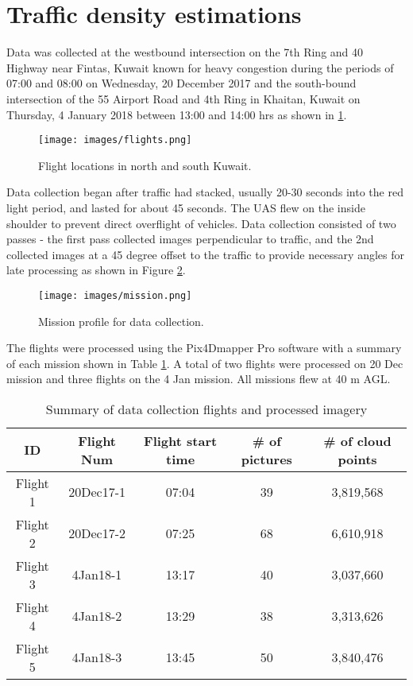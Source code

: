 \section{Traffic density estimations}

Data was collected at the westbound intersection on the 7th Ring and 40 Highway near Fintas, Kuwait known for heavy congestion during the periods of 07:00 and 08:00 on Wednesday, 20 December 2017 and the south-bound intersection of the 55 Airport Road and 4th Ring in Khaitan, Kuwait on Thursday, 4 January 2018 between 13:00 and 14:00 hrs as shown in \ref{fig:flights}. 


\begin{figure}[H]
\centering
\texttt{[image: images/flights.png]} 
\caption[Flight locations]{Flight locations in north and south Kuwait.}
\label{fig:flights}
\end{figure}

Data collection began after traffic had stacked, usually 20-30 seconds into the red light period, and lasted for about 45 seconds. The UAS flew on the inside shoulder to prevent direct overflight of vehicles. Data collection consisted of two passes - the first pass collected images perpendicular to traffic, and the 2nd collected images at a 45 degree offset to the traffic to provide necessary angles for late processing as shown in Figure \ref{fig:mission}.

\begin{figure}[H]
\centering
\texttt{[image: images/mission.png]} 
\caption{Mission profile for data collection.}
\label{fig:mission}
\end{figure}

The flights were processed using the Pix4Dmapper Pro software with a summary of each mission shown in Table \ref{tb:flightdata}. A total of two flights were processed on 20 Dec mission and three flights on the 4 Jan mission. All missions flew at 40 m AGL.

\begin{table}[H]
\centering
\caption{Summary of data collection flights and processed imagery}
\label{tb:flightdata}
\begin{tabular}{@{}ccccc@{}}
\toprule
\textbf{ID} & \textbf{Flight Num} &\textbf{Flight start time} & \textbf{\# of pictures} & \textbf{\# of cloud points} \\ \midrule
Flight 1 & 20Dec17-1 & 07:04 & 39 & 3,819,568 \\
Flight 2 &20Dec17-2 & 07:25 & 68 & 6,610,918 \\
Flight 3 &4Jan18-1 & 13:17 & 40 & 3,037,660 \\
Flight 4 &4Jan18-2 & 13:29 & 38 & 3,313,626 \\
Flight 5 &4Jan18-3 & 13:45 & 50 & 3,840,476 \\ \bottomrule
\end{tabular}
\end{table}


